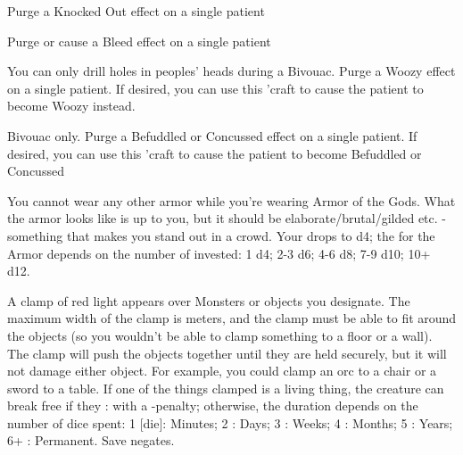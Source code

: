 {  \LEECHCRAFT[
    Name=Smelling Salts,
    Link=leechcraft-smelling-salts,
    Target=3,
    Keywords=Purge,
    Reversible=N
  ]
  Purge a Knocked Out effect on a single patient


  \LEECHCRAFT[
    Name=Staunch,
    Link=leechcraft-staunch,
    Target=4,
    Keywords=Purge,
    Reversible=Y
  ]
  Purge or cause a Bleed effect on a single patient


  \LEECHCRAFT[
    Name=Trepanation,
    Link=leechcraft-trepanation,
    Target=8,
    Keywords=Purge,
    Reversible=Y  
  ]
  You can only drill holes in peoples' heads during a Bivouac.  Purge a Woozy effect on a single patient.   If desired, you can use this 'craft to cause the patient to become Woozy instead.

  \LEECHCRAFT[
    Name=Virtigo,
    Link=leechcraft-virtigo,
    Target=6,
    Keywords=None,
    Reversible=Y 
  ]
  
  Bivouac only.  Purge a Befuddled or Concussed effect on a single patient.   If desired, you can use this 'craft to cause the patient to become Befuddled or Concussed


\newpage




\MYSTERY [
  Name = Armor of the Gods,
  Link = arcana-mystery-armor-of-the-gods,
  Paradigm = Force,
  Save = N,
  Duration = Session,
  Target = Self
]

You cannot wear any other armor while you're wearing Armor of the Gods.  What the armor looks like is up to you, but it should be elaborate/brutal/gilded etc. - something that makes you stand out in a crowd.  Your \MD drops to d4; the \UD for the Armor depends on the number of \DICE invested: 1 d4; 2-3 d6; 4-6 d8; 7-9 d10; 10+ d12.

\MYSTERY [
  Name = Clamp,
  Link = arcana-mystery-clamp,
  Paradigm = Force,
  Save = Y (neg.),
  Duration = varies,
  Target = Nearby Target(s)
]

A clamp of red light appears over \DICE Monsters or objects you designate. The maximum width of the clamp is \DICE meters, and the clamp must be able to fit around the objects (so you wouldn't be able to clamp something to a floor or a wall).  The clamp will push the objects together until they are held securely, but it will not damage either object.  For example, you could clamp an orc to a chair or a sword to a table.  If one of the things clamped is a living thing, the creature can break free if they \RB : \VIG with a -\DICE penalty; otherwise, the duration depends on the number of dice spent:  1 [die]: Minutes; 2 \DICE: Days; 3 \DICE: Weeks; 4 \DICE: Months; 5 \DICE: Years; 6+ \DICE: Permanent.  Save negates.


}
